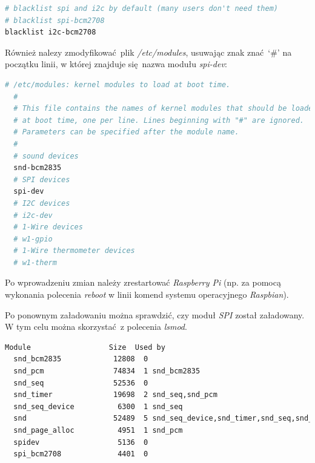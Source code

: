 \documentclass[eng,printmode]{mgr}
\begin{document}
\vspace{0.5cm}
\begin{lstlisting}[language=bash,frame=single,caption={Zmodyfikowany plik \emph{/etc/modprobe.d/raspi-blacklist.conf}}]
# blacklist spi and i2c by default (many users don't need them)
# blacklist spi-bcm2708
blacklist i2c-bcm2708
\end{lstlisting}

Również nalezy zmodyfikować plik \emph{/etc/modules}, usuwając znak znać `\#' na początku linii, w której znajduje się nazwa modułu \emph{spi-dev}:
\vspace{0.5cm}

\begin{minipage}{\textwidth}
  \begin{lstlisting}[language=bash,frame=single,caption={Zmodyfikowany plik \emph{/etc/modules}}]
  # /etc/modules: kernel modules to load at boot time.  
  #  
  # This file contains the names of kernel modules that should be loaded  
  # at boot time, one per line. Lines beginning with "#" are ignored.  
  # Parameters can be specified after the module name.  
  #  
  # sound devices  
  snd-bcm2835  
  # SPI devices  
  spi-dev  
  # I2C devices  
  # i2c-dev  
  # 1-Wire devices  
  # w1-gpio  
  # 1-Wire thermometer devices  
  # w1-therm 
  \end{lstlisting} 
\end{minipage}

Po wprowadzeniu zmian należy zrestartować \emph{Raspberry Pi} (np. za pomocą wykonania polecenia \emph{reboot} w linii komend systemu operacyjnego \emph{Raspbian}). 

Po ponownym załadowaniu można sprawdzić, czy moduł \emph{SPI} został załadowany. W tym celu można skorzystać z polecenia \emph{lsmod}.
\vspace{0.5cm}

\begin{minipage}{\textwidth}
  \begin{lstlisting}[language=bash,frame=single,caption={Wynik wykonania polecenia \emph{lsmod}}]
  Module                  Size  Used by
  snd_bcm2835            12808  0
  snd_pcm                74834  1 snd_bcm2835
  snd_seq                52536  0
  snd_timer              19698  2 snd_seq,snd_pcm
  snd_seq_device          6300  1 snd_seq
  snd                    52489  5 snd_seq_device,snd_timer,snd_seq,snd_pcm,snd_bcm2835
  snd_page_alloc          4951  1 snd_pcm
  spidev                  5136  0
  spi_bcm2708             4401  0
  \end{lstlisting} 
\end{minipage}
\end{document}
